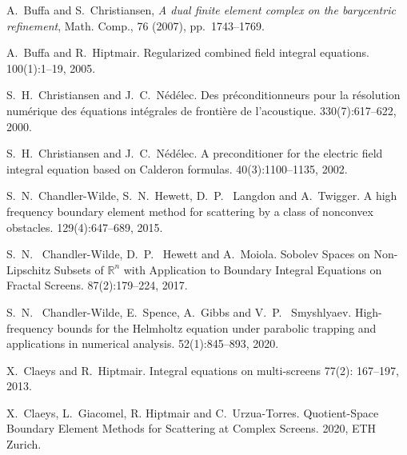 \documentclass[]{report}
\begin{document}
\begin{small}
\begin{thebibliography}{0}
                  {\sc A.~Buffa and S.~Christiansen}, {\em A dual finite element complex on the
                    barycentric refinement}, Math. Comp., 76 (2007), pp.~1743--1769.

                
		A.~Buffa and R.~Hiptmair.
		\newblock Regularized combined field integral equations.
		 100(1):1--19, 2005.	
		
		S.~H.~Christiansen and J.~C.~Nédélec.
		\newblock Des préconditionneurs pour la résolution numérique des équations intégrales de frontière de l'acoustique.
		  330(7):617--622, 2000.
		
		S.~H.~Christiansen and J.~C.~Nédélec.
		\newblock A preconditioner for the electric field integral equation based on Calderon formulas.
		  40(3):1100--1135, 2002.
		
		S.~N.~Chandler-Wilde, S.~N.~Hewett, D.~P.~ Langdon and A.~Twigger.
		\newblock A high frequency boundary element method for scattering by a class of nonconvex obstacles.
		 129(4):647--689, 2015.
		
		S.~N.~ Chandler-Wilde, D.~P.~ Hewett and A.~Moiola.
		\newblock Sobolev Spaces on Non-Lipschitz Subsets of ${\mathbb {R}}^n$ with Application to Boundary Integral Equations on Fractal Screens. 
		 87(2):179--224, 2017.
		
		S.~N.~ Chandler-Wilde, E.~Spence, A.~Gibbs and V.~P.~ Smyshlyaev.
		\newblock High-frequency bounds for the Helmholtz equation under parabolic trapping and applications in numerical analysis.
		52(1):845--893, 2020.	
		
		X.~Claeys and R.~Hiptmair.
		\newblock Integral equations on multi-screens
		 77(2): 167--197, 2013.
		
		X.~Claeys, L.~Giacomel, R. Hiptmair and C.~Urzua-Torres.
		\newblock Quotient-Space Boundary Element Methods for Scattering at Complex Screens.
		 2020, ETH Zurich.
		

\end{thebibliography}
\end{small}
\end{document}
